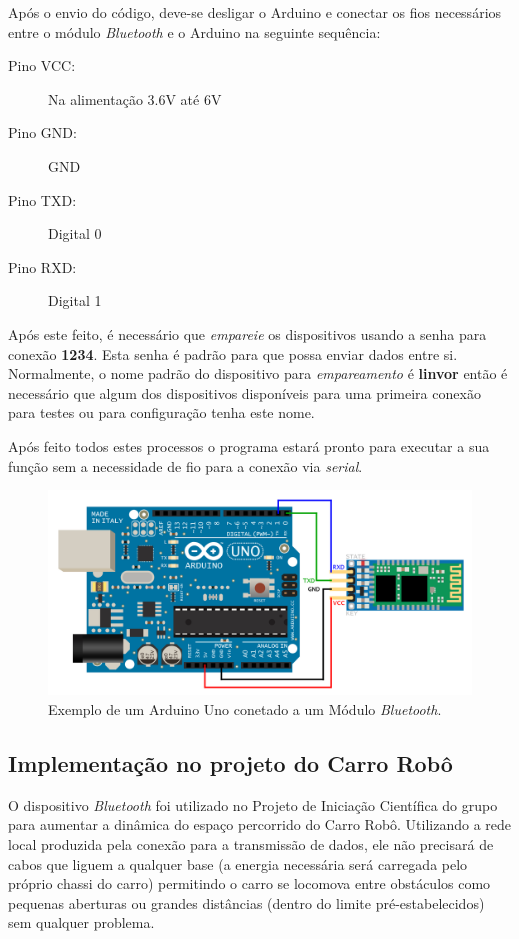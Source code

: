 \documentclass[portugues, brazil, a4paper,12pt]{article}
\begin{document}
Após o envio do código, deve-se desligar o Arduino e conectar os fios necessários entre o módulo \textit{Bluetooth} e o Arduino na seguinte sequência:

\begin{description}
\item[Pino VCC:] Na alimentação 3.6V até 6V
\item[Pino GND:] GND
\item[Pino TXD:] Digital 0
\item[Pino RXD:] Digital 1
\end{description}

Após este feito, é necessário que \textit{empareie} os dispositivos usando a senha para conexão \textbf{1234}. Esta senha é padrão para que possa enviar dados entre si. Normalmente, o nome padrão do dispositivo para \textit{empareamento} é \textbf{linvor} então é necessário que algum dos dispositivos disponíveis para uma primeira conexão para testes ou para configuração tenha este nome.

Após feito todos estes processos o programa estará pronto para executar a sua função sem a necessidade de fio para a conexão via \textit{serial}. 


\begin{figure}[h]
	\includegraphics[width=1.1\textwidth]{arduino.png}
	\caption{Exemplo de um Arduino Uno conetado a um Módulo \textit{Bluetooth}.}
	\label{fig:arduino}
\end{figure}

\subsection{Implementação no projeto do Carro Robô}

O dispositivo \textit{Bluetooth} foi utilizado no Projeto de Iniciação Científica do grupo para aumentar a dinâmica do espaço percorrido do Carro Robô. Utilizando a rede local produzida pela conexão para a transmissão de dados, ele não precisará de cabos que liguem a qualquer base (a energia necessária será carregada pelo próprio chassi do carro) permitindo o carro se locomova entre obstáculos como pequenas aberturas ou grandes distâncias (dentro do limite pré-estabelecidos) sem qualquer problema.
\end{document}
